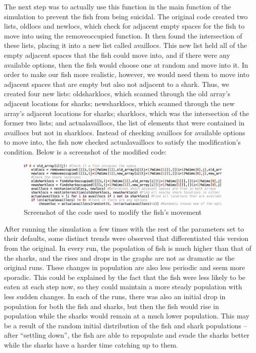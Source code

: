\documentclass[12pt]{iopart} %
\begin{document}
The next step was to actually use this function in the main function of the simulation to prevent the fish from being suicidal. 
The original code created two lists, oldlocs and newlocs, which check for adjacent empty spaces for the fish to move into using the removeoccupied function. 
It then found the intersection of these lists, placing it into a new list called availlocs. 
This new list held all of the empty adjacent spaces that the fish could move into, and if there were any available options, then the fish would choose one at random and move into it. 
In order to make our fish more realistic, however, we would need them to move into adjacent spaces that are empty but also not adjacent to a shark. 
Thus, we created four new lists: oldsharklocs, which scanned through the old array’s adjacent locations for sharks; newsharklocs, which scanned through the new array’s adjacent locations for sharks; sharklocs, which was the intersection of the former two lists; and actualavaillocs, the list of elements that were contained in availlocs but not in sharklocs. 
Instead of checking availlocs for available options to move into, the fish now checked actualavaillocs to satisfy the modification’s condition. 
Below is a screenshot of the modified code:


\begin{figure}[htbp]
  \begin{center}
  \item[]\includegraphics[width=0.95\textwidth]{modifiedFishMovement.png}
  \caption{\label{fig:modifiedFishMovement}
  Screenshot of the code used to modify the fish’s movement
  }
  \end{center}
\end{figure}


After running the simulation a few times with the rest of the parameters set to their defaults, some distinct trends were observed that differentiated this version from the original. 
In every run, the population of fish is much higher than that of the sharks, and the rises and drops in the graphs are not as dramatic as the original runs. 
These changes in population are also less periodic and seem more sporadic. 
This could be explained by the fact that the fish were less likely to be eaten at each step now, so they could maintain a more steady population with less sudden changes. 
In each of the runs, there was also an initial drop in population for both the fish and sharks, but then the fish would rise in population while the sharks would remain at a much lower population. 
This may be a result of the random initial distribution of the fish and shark populations – after “settling down”, the fish are able to repopulate and evade the sharks better while the sharks have a harder time catching up to them.
\end{document}
